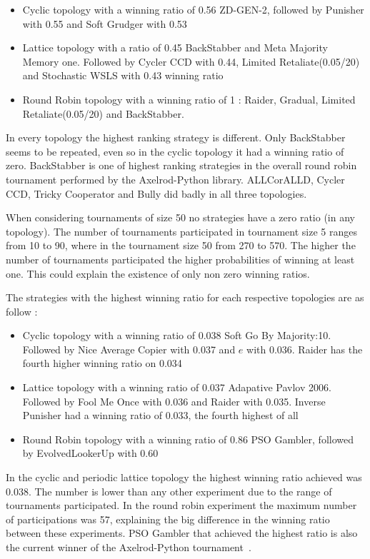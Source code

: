 \begin{itemize}
	\item Cyclic topology with a winning ratio of 0.56 ZD-GEN-2, followed by Punisher
	      with 0.55 and Soft Grudger with 0.53
	\item Lattice topology with a ratio of 0.45 BackStabber and Meta Majority
	      Memory one. Followed by Cycler CCD with 0.44, Limited Retaliate(0.05/20)
	      and Stochastic WSLS with 0.43 winning ratio
	\item Round Robin topology with a winning ratio of 1 : Raider, Gradual, Limited
	      Retaliate(0.05/20) and BackStabber.
\end{itemize}

In every topology the highest ranking strategy is different.
Only BackStabber seems to be repeated, even so in the cyclic
topology it had a winning ratio of zero. BackStabber is one of highest ranking
strategies in the overall round robin tournament performed by the Axelrod-Python
library. ALLCorALLD, Cycler CCD, Tricky Cooperator and Bully did badly in all
three topologies.

When considering tournaments of size 50 no strategies have a zero ratio
(in any topology). The number of tournaments participated in tournament size 5
ranges from 10 to 90, where in the tournament size 50 from 270 to 570. The higher
the number of tournaments participated the higher probabilities of winning at
least one. This could explain the existence of only non zero winning ratios.

The strategies with the highest winning ratio for each respective topologies are
as follow :

\begin{itemize}
	\item Cyclic topology with a winning ratio of 0.038 Soft Go By Majority:10.
	      Followed by Nice Average Copier with 0.037 and \(e\) with 0.036. Raider
	      has the fourth higher winning ratio on 0.034
	\item Lattice topology with a winning ratio of 0.037 Adapative Pavlov 2006.
	      Followed by Fool Me Once with 0.036 and Raider with 0.035. Inverse
	      Punisher had a winning ratio of 0.033, the fourth highest of all
	\item Round Robin topology with a winning ratio of 0.86 PSO Gambler, followed
	      by EvolvedLookerUp with 0.60
\end{itemize}

In the cyclic and periodic lattice topology the highest winning ratio achieved
was 0.038. The number is lower than any other experiment due to the range of
tournaments participated. In the round robin experiment the maximum number of
participations was 57, explaining the big difference in the winning ratio between
these experiments. PSO Gambler that achieved the highest ratio is also the current
winner of the Axelrod-Python tournament~\cite{pso_gambler}.

